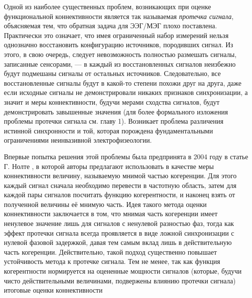 Одной из наиболее существенных проблем, возникающих при оценке функциональной коннективности является 
так называемая \emph{протечка сигнала}, объясняемая тем, что обратная задача для ЭЭГ/МЭГ
плохо поставлена. Практически это означает, что имея ограниченный набор измерений нельзя однозначно восстановить 
конфигурацию источников, породивших сигнал. Из этого, в свою очередь, следует невозможность полностью 
размешать сигналы, записанные сенсорами, --- в каждый из восстановленных сигналов неизбежно будут
подмешаны сигналы от остальных источников. Следовательно, все восстановленные сигналы будут в какой-то 
степени похожи друг на друга, даже если исходные сигналы не демонстрировали никаких признаков синхронизации, а значит и 
меры коннективности, будучи мерами сходства сигналов, будут демонстрировать завышенные значения
(для более формального изложения проблемы протечки сигнала см. главу 1). Возникает проблема различения истинной синхронности 
и той, которая порождена фундаментальными ограничениями неинвазивной электрофизеологии.

Впервые попытка решения этой проблемы была предпринята в 2004 году в статье Г. Нолте
,
в которой авторы предлагают использовать в качестве меры коннективности величину, называемую мнимой частью когеренции. 
Для этого каждый сигнал сначала необходимо перевести в частотную область,
затем для каждой пары сигналов посчитать функцию когерентности, и наконец взять от полученной величины её мнимую часть. 
Идея такого метода оценки коннективности заключается в том, что мнимая часть когеренции имеет ненулевое значение лишь 
для сигналов с ненулевой разностью фаз, тогда как эффект протечки сигнала всегда проявляется в виде ложной синхронизации 
с нулевой фазовой задержкой, давая тем самым вклад лишь в действительную часть когеренции. Действительно, такой подход 
существенно повышает устойчивость метода к протечке сигнала. Тем не менее, так как функция когерентности 
нормируется на оцененные мощности сигналов (которые, будучи чисто действительными величинами, подвержены влиянию 
протечки сигнала) итоговые оценки коннективности






 \ifsynopsis

